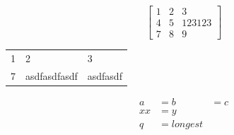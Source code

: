 \[
\begin{bmatrix}
1 & 2 & 3 \\
4 & 5 & 123123 \\
7 & 8 & 9
\end{bmatrix}
\]

\begin{tabular}{lll}
1 & 2 & 3 \\
7 & asdfasdfasdf & asdfasdf
\end{tabular}

\begin{align}
a &= b &= c \\
xx &= y \\[2ex] %
q &= longest
\end{align}
